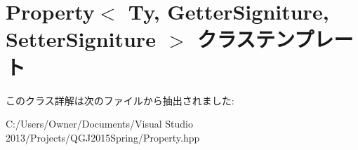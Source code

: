 \hypertarget{class_property}{}\section{Property$<$ Ty, Getter\+Signiture, Setter\+Signiture $>$ クラステンプレート}
\label{class_property}


このクラス詳解は次のファイルから抽出されました\+:\begin{DoxyCompactItemize}
\item 
C\+:/\+Users/\+Owner/\+Documents/\+Visual Studio 2013/\+Projects/\+Q\+G\+J2015\+Spring/Property.\+hpp\end{DoxyCompactItemize}
